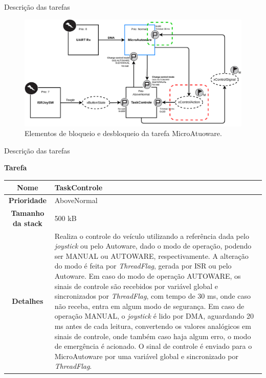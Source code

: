 \documentclass{if-beamer}
\begin{document}
\begin{frame}{Descrição das tarefas}

\begin{figure}
	\centering
	\includegraphics[width = \textwidth]{img/microautoware_blockrelease}
	\caption{Elementos de bloqueio e desbloqueio da tarefa MicroAtuoware.}
	\label{fig:microautoware_blockrelease}
\end{figure}

\end{frame}



\begin{frame}{Descrição das tarefas}
	
\begin{block}{\textbf{Tarefa}}
	
	\centering
	
	\begin{tabular}{c|p{8cm}}
		\textbf{Nome} & TaskControle \\
		\hline
		\textbf{Prioridade}& AboveNormal \\
		\hline
		\textbf{Tamanho da stack} & 500 kB \\
		\hline
		\textbf{Detalhes} & Realiza o controle do veículo utilizando a referência dada pelo \textit{joystick} ou pelo Autoware, dado o modo de operação, podendo ser MANUAL ou AUTOWARE, respectivamente. A alteração do modo é feita por \textit{ThreadFlag}, gerada por ISR ou pelo Autoware. Em caso do modo de operação AUTOWARE, os sinais de controle são recebidos por variável global e sincronizados por \textit{ThreadFlag}, com tempo de 30 ms, onde caso não receba, entra em algum modo de segurança. Em caso de operação MANUAL,  o \textit{joystick} é lido por DMA, aguardando 20 ms antes de cada leitura,  convertendo os valores analógicos em sinais de controle, onde também caso haja algum erro, o modo de emergência é acionado. O sinal de controle é enviado para o MicroAutoware por uma variável global e sincronizado por \textit{ThreadFlag}. 
	\end{tabular}
	
\end{block}	
	
\end{frame}
\end{document}
